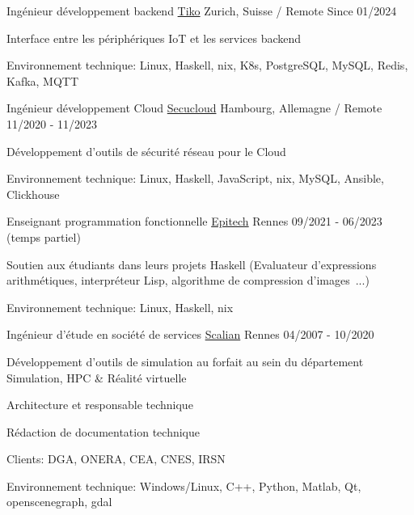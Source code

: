 \begin{cventries}
  \cventry
    {Ingénieur développement backend}
    {\href{https://www.tiko.fr/}{Tiko}}
    {Zurich, Suisse / Remote}
    {Since 01/2024}
    {
      \begin{cvitems}
        \item {Interface entre les périphériques IoT et les services backend}
        \item {Environnement technique: Linux, Haskell, nix, K8s, PostgreSQL, 
            MySQL, Redis, Kafka, MQTT}
      \end{cvitems}
    }

  \cventry
    {Ingénieur développement Cloud}
    {\href{https://www.linkedin.com/company/secucloud/}{Secucloud}}
    {Hambourg, Allemagne / Remote}
    {11/2020 - 11/2023}
    {
      \begin{cvitems}
        \item {Développement d'outils de sécurité réseau pour le Cloud}
        \item {Environnement technique: Linux, Haskell, JavaScript, nix,
            MySQL, Ansible, Clickhouse}
      \end{cvitems}
    }

  \cventry
    {Enseignant programmation fonctionnelle}
    {\href{https://www.epitech.eu/}{Epitech}}
    {Rennes}
    {09/2021 - 06/2023 (temps partiel)}
    {
      \begin{cvitems}
          \item {Soutien aux étudiants dans leurs projets Haskell (Evaluateur
              d'expressions arithmétiques, interpréteur Lisp, algorithme de
              compression d'images~...)}
          \item {Environnement technique: Linux, Haskell, nix}
      \end{cvitems}
    }

  \cventry
    {Ingénieur d'étude en société de services}
    {\href{https://www.scalian.com/}{Scalian}}
    {Rennes}
    {04/2007 - 10/2020}
    {
      \begin{cvitems}
        \item {Développement d'outils de simulation au forfait au sein du
            département Simulation, HPC \& Réalité virtuelle}
        \item {Architecture et responsable technique}
        \item {Rédaction de documentation technique}
        \item {Clients: DGA, ONERA, CEA, CNES, IRSN}
        \item {Environnement technique: Windows/Linux, C++, Python, Matlab, Qt,
            openscenegraph, gdal}
      \end{cvitems}
    }


\end{cventries}
